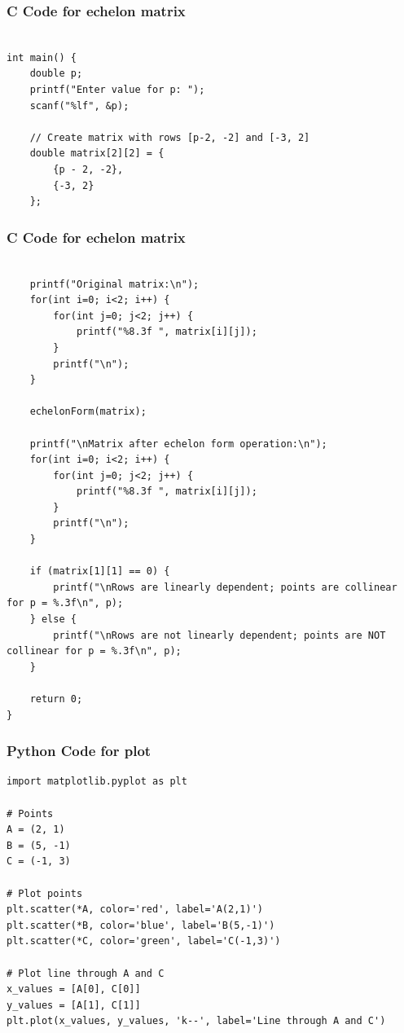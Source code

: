 \documentclass{beamer}
\begin{document}
\begin{frame}[fragile]
    \frametitle{C Code for echelon matrix }

    \begin{lstlisting}

int main() {
    double p;
    printf("Enter value for p: ");
    scanf("%lf", &p);

    // Create matrix with rows [p-2, -2] and [-3, 2]
    double matrix[2][2] = {
        {p - 2, -2},
        {-3, 2}
    };
    \end{lstlisting}
\end{frame}
\begin{frame}[fragile]
    \frametitle{C Code for echelon matrix }

    \begin{lstlisting}

    printf("Original matrix:\n");
    for(int i=0; i<2; i++) {
        for(int j=0; j<2; j++) {
            printf("%8.3f ", matrix[i][j]);
        }
        printf("\n");
    }

    echelonForm(matrix);

    printf("\nMatrix after echelon form operation:\n");
    for(int i=0; i<2; i++) {
        for(int j=0; j<2; j++) {
            printf("%8.3f ", matrix[i][j]);
        }
        printf("\n");
    }

    if (matrix[1][1] == 0) {
        printf("\nRows are linearly dependent; points are collinear for p = %.3f\n", p);
    } else {
        printf("\nRows are not linearly dependent; points are NOT collinear for p = %.3f\n", p);
    }

    return 0;
}

    \end{lstlisting}
\end{frame}

\begin{frame}[fragile]
    \frametitle{Python Code for plot}
    \begin{lstlisting}
import matplotlib.pyplot as plt

# Points
A = (2, 1)
B = (5, -1)
C = (-1, 3)

# Plot points
plt.scatter(*A, color='red', label='A(2,1)')
plt.scatter(*B, color='blue', label='B(5,-1)')
plt.scatter(*C, color='green', label='C(-1,3)')

# Plot line through A and C
x_values = [A[0], C[0]]
y_values = [A[1], C[1]]
plt.plot(x_values, y_values, 'k--', label='Line through A and C')

    \end{lstlisting}
\end{frame}
\end{document}
